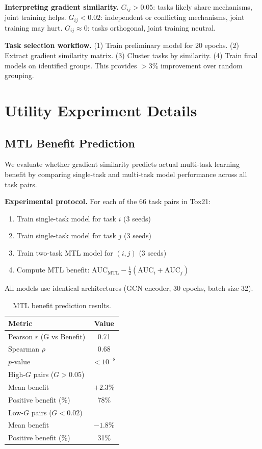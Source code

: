 \documentclass{article}
\begin{document}
\textbf{Interpreting gradient similarity.} $G_{ij} > 0.05$: tasks likely share mechanisms, joint training helps. $G_{ij} < 0.02$: independent or conflicting mechanisms, joint training may hurt. $G_{ij} \approx 0$: tasks orthogonal, joint training neutral.

\textbf{Task selection workflow.} (1) Train preliminary model for 20 epochs. (2) Extract gradient similarity matrix. (3) Cluster tasks by similarity. (4) Train final models on identified groups. This provides $>$3\% improvement over random grouping.

\section{Utility Experiment Details}
\label{app:utility}

\subsection{MTL Benefit Prediction}

We evaluate whether gradient similarity predicts actual multi-task learning benefit by comparing single-task and multi-task model performance across all task pairs.

\textbf{Experimental protocol.} For each of the 66 task pairs in Tox21:
\begin{enumerate}[nosep,topsep=2pt]
    \item Train single-task model for task $i$ (3 seeds)
    \item Train single-task model for task $j$ (3 seeds)
    \item Train two-task MTL model for $(i, j)$ (3 seeds)
    \item Compute MTL benefit: $\text{AUC}_{\text{MTL}} - \frac{1}{2}(\text{AUC}_i + \text{AUC}_j)$
\end{enumerate}
All models use identical architectures (GCN encoder, 30 epochs, batch size 32).

\begin{table}[H]
\caption{MTL benefit prediction results.}
\begin{center}
\begin{tabular}{lc}
\toprule
Metric & Value \\
\midrule
Pearson $r$ (G vs Benefit) & 0.71 \\
Spearman $\rho$ & 0.68 \\
$p$-value & $< 10^{-8}$ \\
\midrule
High-$G$ pairs ($G > 0.05$) & \\
\quad Mean benefit & $+2.3\%$ \\
\quad Positive benefit (\%) & 78\% \\
\midrule
Low-$G$ pairs ($G < 0.02$) & \\
\quad Mean benefit & $-1.8\%$ \\
\quad Positive benefit (\%) & 31\% \\
\bottomrule
\end{tabular}
\end{center}
\end{table}
\end{document}
